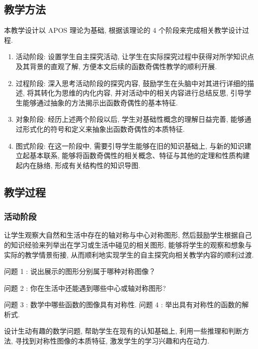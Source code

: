 \subsection{教学方法}
本教学设计以 APOS 理论为基础, 根据该理论的 4 个阶段来完成相关教学设计过程.
\begin{enumerate}
	\item 活动阶段: 设置学生自主探究活动, 让学生在实际探究过程中获得对所学知识点及其背景的直观了解, 方便本文后续的函数奇偶性教学的顺利开展.
	\item 过程阶段: 深入思考活动阶段的探究内容, 鼓励学生在头脑中对其进行详细的描述, 将其转化为思维的内化内容, 并对活动中的相关内容进行总结反思, 引导学生能够通过抽象的方法揭示出函数奇偶性的基本特征.
	\item 对象阶段: 经历上述两个阶段以后, 学生对基础性概念的理解日益完善, 能够通过形式化的符号和定义来抽象出函数奇偶性的本质特征.
	\item 图式阶段: 在这一阶段中, 需要引导学生能够在旧的知识基础上, 与新的知识建立起基本联系, 能够将函数奇偶性的相关概念、特征与其他的定理和性质构建起内在脉络, 形成有关结构性的知识导图.
\end{enumerate}

\subsection{教学过程}
\subsubsection{活动阶段}
\begin{activity}
	让学生观察大自然和生活中存在的轴对称与中心对称图形, 然后鼓励学生根据自己的知识经验来列举出在学习或生活中碰见的相关图形, 能够将学生的观察和想象与实际的教学情景衔接, 从而顺利地实现学生的自主探究向相关教学内容的顺利过渡.

	问题 1 : 说出展示的图形分别属于哪种对称图像？

	问题 2 : 你在生活中还能遇到哪些中心或轴对称图形?


	问题 3 : 数学中哪些函数的图像具有对称性. 问题 4 : 举出具有对称性的函数的解析式.
\end{activity}
\begin{purpose}
	设计生动有趣的数学问题, 帮助学生在现有的认知基础上, 利用一些推理和判断方法, 寻找到对称性图像的本质特征, 激发学生的学习兴趣和内在动力.
\end{purpose}

